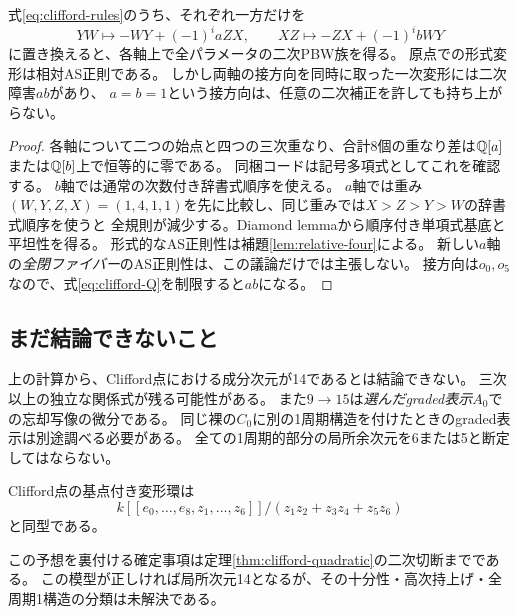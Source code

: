 \begin{proposition}[二つの積分可能な軸と混合障害]\label{prop:two-axes}
式\eqref{eq:clifford-rules}のうち、それぞれ一方だけを
\[
 YW\mapsto-WY+(-1)^i aZX,\qquad
 XZ\mapsto-ZX+(-1)^i bWY
\]
に置き換えると、各軸上で全パラメータの二次PBW族を得る。
原点での形式変形は相対AS正則である。
しかし両軸の接方向を同時に取った一次変形には二次障害$ab$があり、
$a=b=1$という接方向は、任意の二次補正を許しても持ち上がらない。
\end{proposition}
\begin{proof}
各軸について二つの始点と四つの三次重なり、合計8個の重なり差は$\mathbb Q[a]$または$\mathbb Q[b]$上で恒等的に零である。
同梱コードは記号多項式としてこれを確認する。
$b$軸では通常の次数付き辞書式順序を使える。
$a$軸では重み$(W,Y,Z,X)=(1,4,1,1)$を先に比較し、同じ重みでは$X>Z>Y>W$の辞書式順序を使うと
全規則が減少する。Diamond lemmaから順序付き単項式基底と平坦性を得る。
形式的なAS正則性は補題\ref{lem:relative-four}による。
新しい$a$軸の\emph{全閉ファイバー}のAS正則性は、この議論だけでは主張しない。
接方向は$o_0,o_5$なので、式\eqref{eq:clifford-Q}を制限すると$ab$になる。
\end{proof}

\subsection{まだ結論できないこと}
上の計算から、Clifford点における成分次元が14であるとは結論できない。
三次以上の独立な関係式が残る可能性がある。
また$9\to15$は\emph{選んだgraded表示}$A_0$での忘却写像の微分である。
同じ裸の$C_0$に別の1周期構造を付けたときのgraded表示は別途調べる必要がある。
全ての1周期的部分の局所余次元を6または5と断定してはならない。

\begin{conjecture}[検証対象の局所模型]\label{conj:clifford-model}
Clifford点の基点付き変形環は
\[
 k[[e_0,\ldots,e_8,z_1,\ldots,z_6]]/
 (z_1z_2+z_3z_4+z_5z_6)
\]
と同型である。
\end{conjecture}
この予想を裏付ける確定事項は定理\ref{thm:clifford-quadratic}の二次切断までである。
この模型が正しければ局所次元14となるが、その十分性・高次持上げ・全周期1構造の分類は未解決である。

